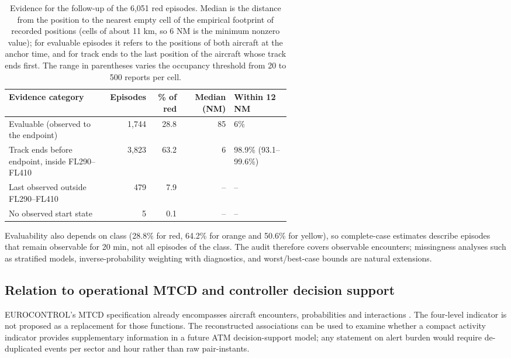 \documentclass[aerospace,article,submit,moreauthors]{Definitions/mdpi}
\begin{document}
\begin{table}[tbp]
\caption{Evidence for the follow-up of the 6,051 red episodes. Median is the distance from the position to the nearest empty cell of the empirical footprint of recorded positions (cells of about 11 km, so 6 NM is the minimum nonzero value); for evaluable episodes it refers to the positions of both aircraft at the anchor time, and for track ends to the last position of the aircraft whose track ends first. The range in parentheses varies the occupancy threshold from 20 to 500 reports per cell.}\label{tab:evidence}
\centering\small\setlength{\tabcolsep}{4pt}
\begin{tabular}{@{}p{0.36\linewidth}rrrp{0.2\linewidth}@{}}
\toprule
Evidence category & Episodes & \% of red & Median (NM) & Within 12 NM\\
\midrule
Evaluable (observed to the endpoint) & 1,744 & 28.8 & 85 & 6\%\\
Track ends before endpoint, inside FL290--FL410 & 3,823 & 63.2 & 6 & 98.9\% (93.1--99.6\%)\\
Last observed outside FL290--FL410 & 479 & 7.9 & -- & --\\
No observed start state & 5 & 0.1 & -- & --\\
\bottomrule
\end{tabular}
\end{table}

Evaluability also depends on class (28.8\% for red, 64.2\% for orange and 50.6\% for yellow), so complete-case estimates describe episodes that remain observable for 20 min, not all episodes of the class. The audit therefore covers observable encounters; missingness analyses such as stratified models, inverse-probability weighting \cite{seaman2013} with diagnostics, and worst/best-case bounds are natural extensions.

\subsection{Relation to operational MTCD and controller decision support}
EUROCONTROL's MTCD specification already encompasses aircraft encounters, probabilities and interactions \cite{eurocontrol2017}. The four-level indicator is not proposed as a replacement for those functions. The reconstructed associations can be used to examine whether a compact activity indicator provides supplementary information in a future ATM decision-support model; any statement on alert burden would require de-duplicated events per sector and hour rather than raw pair-instants.
\end{document}
